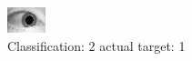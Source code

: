 \begin{figure}[h!]
\begin{center}
\includegraphics[width=0.60\columnwidth]{figures/ID1504_class_2_target_1.png}
\end{center}
\caption{ Classification: 2 actual target: 1}
\label{fig:ID1504_class_2_target_1}
\end{figure}
